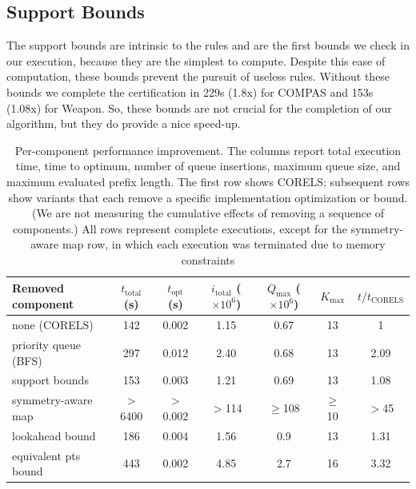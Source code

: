 \subsection{Support Bounds}

The support bounds are intrinsic to the rules and are the first bounds we check in our execution, because they are the simplest to compute.
Despite this ease of computation, these bounds prevent the pursuit of useless rules.
Without these bounds we complete the certification in 229s (1.8x) for COMPAS and 153s (1.08x) for Weapon.
So, these bounds are not crucial for the completion of our algorithm, but they do provide a nice speed-up.

\begin{table}[t!]
\begin{adjustwidth}{-.4in}{-.4in}
\begin{tabular}{l | c | c | c | c | c | c} 
  Removed component & $t_\text{total}$ (s) & $t_\text{opt}$ (s) & $i_\text{total}$ ($\times 10^6$) & $Q_\text{max}$ ($\times 10^6$) & $K_\text{max}$ & $t/t_\text{CORELS}$ \\
\hline
none (CORELS) & 142 & 0.002 & 1.15 & 0.67 & 13 & 1 \\
priority queue (BFS) & 297 & 0.012 & 2.40 & 0.68 & 13 & 2.09\\
support bounds & 153 & 0.003 & 1.21 & 0.69 & 13 & 1.08 \\
symmetry-aware map & $>$ 6400 & $>$0.002 & $>$114 & $\ge$108 & $\ge$ 10 & $>$45\\
lookahead bound & 186 & 0.004 & 1.56 & 0.9 & 13 & 1.31\\
equivalent pts bound & 443 & 0.002 & 4.85 & 2.7 & 16 & 3.32
\end{tabular}
\vspace{3mm}
\caption{Per-component performance improvement.
%
The columns report total execution time,
time to optimum, number of queue insertions,
maximum queue size, and maximum evaluated prefix length.
%
The first row shows CORELS; subsequent rows show variants
that each remove a specific implementation optimization or bound.
%
(We are not measuring the cumulative effects of removing a sequence of components.)
%
All rows represent complete executions, except for the symmetry-aware map row,
in which each execution was terminated due to memory constraints
}
\end{adjustwidth}
\label{tab:weapon}
\end{table}

